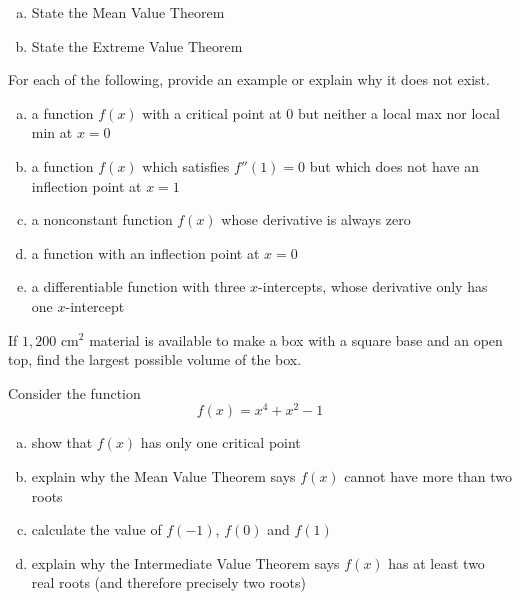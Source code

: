 \documentclass[11pt]{exam}
\theoremstyle{definition}
\begin{document}
\begin{questions}
\newpage
\question[10]\mbox{}
\begin{enumerate}[(a)]
\item  State the Mean Value Theorem
\vspace{2in}
\item  State the Extreme Value Theorem
\end{enumerate}

\newpage
\question[10]\mbox{}
For each of the following, provide an example or explain why it does not exist.
\begin{enumerate}[(a)]
\item  a function $f(x)$ with a critical point at $0$ but neither a local max nor local min at $x=0$
\vspace{1.2in}
\item  a function $f(x)$ which satisfies $f''(1) = 0$ but which does not have an inflection point at $x=1$
\vspace{1.2in}
\item  a nonconstant function $f(x)$ whose derivative is always zero
\vspace{1.2in}
\item  a function with an inflection point at $x=0$
\vspace{1.2in}
\item  a differentiable function with three $x$-intercepts, whose derivative only has one $x$-intercept
\vspace{1.2in}
\end{enumerate}

\newpage
\question[10]
If $1,200$ cm$^2$ material is available to make a box with a square base and an open top, find the largest possible volume of the box.


\newpage
\question[7]
Consider the function
$$f(x) = x^4 +x^2-1$$
\begin{enumerate}[(a)]
\item show that $f(x)$ has only one critical point
\vspace{2in}
\item explain why the Mean Value Theorem says $f(x)$ cannot have more than two roots
\vspace{2in}
\item calculate the value of $f(-1)$, $f(0)$ and $f(1)$
\vspace{2in}
\item explain why the Intermediate Value Theorem says $f(x)$ has at least two real roots (and therefore precisely two roots)
\end{enumerate}
\end{questions}
\end{document}
